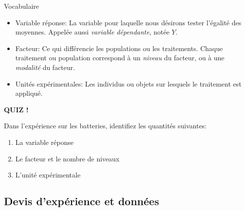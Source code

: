 \documentclass{BeamerTemplate}
\begin{document}
\begin{frame}[t]{Vocabulaire}

\begin{itemize}\itemsep2mm
    \item<1-> \alert{Variable réponse}: La variable pour laquelle nous désirons tester l'égalité des moyennes. Appelée  aussi \textit{variable dépendante}, notée $Y$.
    \item<2-> \alert{Facteur}: Ce qui différencie les populations ou les traitements. 
    Chaque traitement ou population correspond à un \textit{niveau} du facteur, ou à une \textit{modalité} du facteur.
    \item<3-> \alert{Unités expérimentales}: Les individus ou objets sur lesquels le traitement est appliqué.
\end{itemize}

\vspace{5mm}


\end{frame}



\begin{frame}[t]{ }

\centerline{\LARGE\bf \alert{QUIZ !}}
\bigskip

Dans l'expérience sur les batteries, identifiez les quantités suivantes:
\bigskip

\begin{enumerate}[$\bullet$]\itemsep 7mm
\item La variable réponse %
\item Le facteur et le nombre de niveaux %
\item L'unité expérimentale %
\end{enumerate}

\vspace{6mm}

\end{frame}

\subsection{Devis d'expérience et données}
\end{document}
